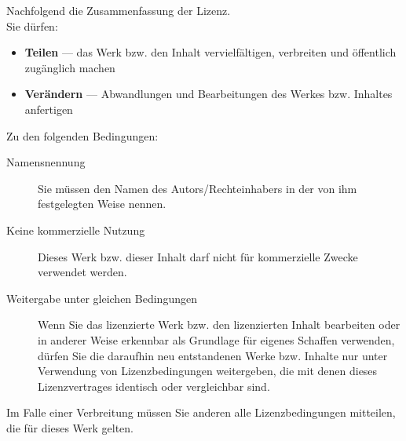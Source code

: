 \noindent
Nachfolgend die Zusammenfassung der Lizenz.\\

\noindent
Sie dürfen:
\begin{itemize}
 \item \textbf{Teilen} — das Werk bzw. den Inhalt vervielfältigen, verbreiten und öffentlich zugänglich machen 
 \item \textbf{Verändern} — Abwandlungen und Bearbeitungen des Werkes bzw. Inhaltes anfertigen
\end{itemize}
\noindent
Zu den folgenden Bedingungen:
\begin{description}
 \item[Namensnennung] Sie müssen den Namen des Autors/Rechteinhabers in der von ihm festgelegten Weise nennen.
 \item[Keine kommerzielle Nutzung] Dieses Werk bzw. dieser Inhalt darf nicht für kommerzielle Zwecke verwendet werden.
 \item[Weitergabe unter gleichen Bedingungen] Wenn Sie das lizenzierte Werk bzw. den lizenzierten Inhalt bearbeiten oder in anderer Weise erkennbar als Grundlage für eigenes Schaffen verwenden, dürfen Sie die daraufhin neu entstandenen Werke bzw. Inhalte nur unter Verwendung von Lizenzbedingungen weitergeben, die mit denen dieses Lizenzvertrages identisch oder vergleichbar sind.
\end{description}

\noindent
Im Falle einer Verbreitung müssen Sie anderen alle Lizenzbedingungen mitteilen, die für dieses Werk gelten.\\

